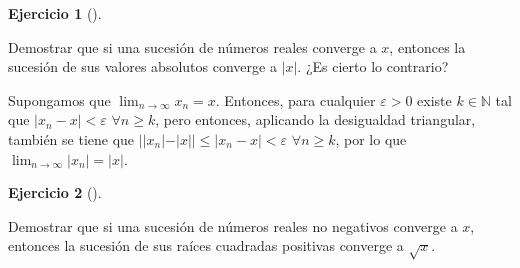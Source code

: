 \documentclass[
  spanish,
  a4paper,
]{scrreport}
\theoremstyle{definition}
\newtheorem{exercise}{Ejercicio}[chapter]
\theoremstyle{remark}
\begin{document}
\begin{exercise}[]\protect\hypertarget{exr-sucesion-valor-absoluto}{}\label{exr-sucesion-valor-absoluto}

Demostrar que si una sucesión de números reales converge a \(x\),
entonces la sucesión de sus valores absolutos converge a \(|x|\). ¿Es
cierto lo contrario?

\end{exercise}

\begin{tcolorbox}[enhanced jigsaw, arc=.35mm, bottomrule=.15mm, bottomtitle=1mm, breakable, colback=white, colbacktitle=quarto-callout-tip-color!10!white, colframe=quarto-callout-tip-color-frame, coltitle=black, left=2mm, leftrule=.75mm, opacityback=0, opacitybacktitle=0.6, rightrule=.15mm, title=\textcolor{quarto-callout-tip-color}{\faLightbulb}\hspace{0.5em}{Solución}, titlerule=0mm, toprule=.15mm, toptitle=1mm]

Supongamos que \(\lim_{n\to\infty}x_n=x\). Entonces, para cualquier
\(\varepsilon>0\) existe \(k\in\mathbb{N}\) tal que
\(|x_n-x|<\varepsilon\) \(\forall n\geq k\), pero entonces, aplicando la
desigualdad triangular, también se tiene que
\(||x_n|-|x||\leq |x_n-x| < \varepsilon\) \(\forall n\geq k\), por lo
que \(\lim_{n\to\infty}|x_n| = |x|\).

\end{tcolorbox}

\begin{exercise}[]\protect\hypertarget{exr-sucesion-raiz-cuadrada}{}\label{exr-sucesion-raiz-cuadrada}

Demostrar que si una sucesión de números reales no negativos converge a
\(x\), entonces la sucesión de sus raíces cuadradas positivas converge a
\(\sqrt{x}\).

\end{exercise}
\end{document}
